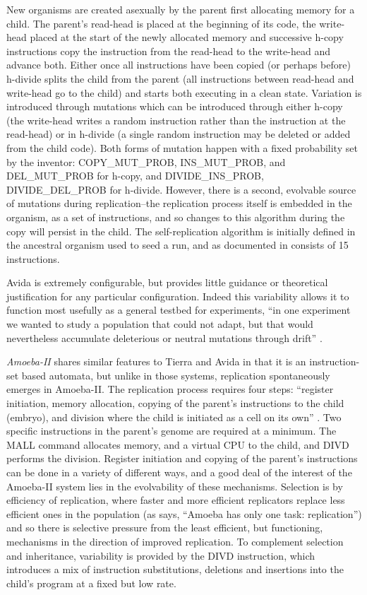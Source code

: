 New organisms are created asexually by the parent first allocating memory for a child. The parent's read-head is placed at the beginning of its code, the write-head placed at the start of the newly allocated memory and successive h-copy instructions copy the instruction from the read-head to the write-head and advance both. Either once all instructions have been copied (or perhaps before) h-divide splits the child from the parent (all instructions between read-head and write-head go to the child) and starts both executing in a clean state. Variation is introduced through mutations which can be introduced through either h-copy (the write-head writes a random instruction rather than the instruction at the read-head) or in h-divide (a single random instruction may be deleted or added from the child code). Both forms of mutation happen with a fixed probability set by the inventor: COPY\_MUT\_PROB, INS\_MUT\_PROB, and DEL\_MUT\_PROB for h-copy, and DIVIDE\_INS\_PROB, DIVIDE\_DEL\_PROB for h-divide. However, there is a second, evolvable source of mutations during replication--the replication process itself is embedded in the organism, as a set of instructions, and so changes to this algorithm during the copy will persist in the child. The self-replication algorithm is initially defined in the ancestral organism used to seed a run, and as documented in \textcite[A1.3]{Ofria2004} consists of 15 instructions.

Avida is extremely configurable, but provides little guidance or theoretical justification for any particular configuration. Indeed this variability allows it to function most usefully as a general testbed for experiments, \eg ``in one experiment we wanted to study a population that could not adapt, but that would nevertheless accumulate deleterious or neutral mutations through drift'' \parencite{Ofria2004}.

\emph{Amoeba-II} \parencite{Pargellis2001} shares similar features to Tierra and Avida in that it is an instruction-set based automata, but unlike in those systems, replication spontaneously emerges in Amoeba-II. The replication process requires four steps: ``register initiation, memory allocation, copying of the parent's instructions to the child (embryo), and division where the child is initiated as a cell on its own'' \parencite[p.69]{Pargellis2001}. Two specific instructions in the parent's genome are required at a minimum. The MALL command allocates memory, and a virtual CPU to the child, and DIVD performs the division. Register initiation and copying of the parent's instructions can be done in a variety of different ways, and a good deal of the interest of the Amoeba-II system lies in the evolvability of these mechanisms. Selection is by efficiency of replication, where faster and more efficient replicators replace less efficient ones in the population (as \textcite{Pargellis2001} says, ``Amoeba has only one task: replication'') and so there is selective pressure from the least efficient, but functioning, mechanisms in the direction of improved replication. To complement selection and inheritance, variability is provided by the DIVD instruction, which introduces a mix of instruction substitutions, deletions and insertions into the child's program at a fixed but low rate.

